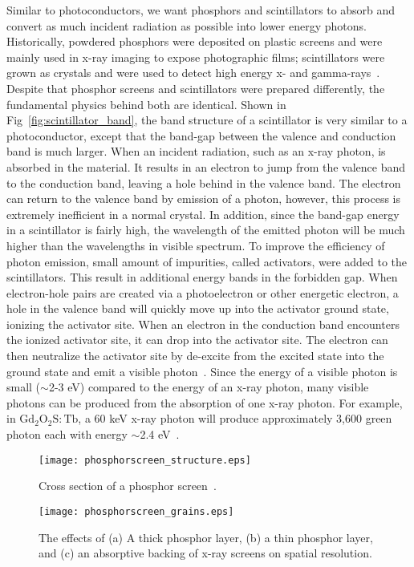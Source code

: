 Similar to photoconductors, we want phosphors and scintillators to absorb and convert as much incident radiation as possible into lower energy photons.  Historically, powdered phosphors were deposited on plastic screens and were mainly used in x-ray imaging to expose photographic films; scintillators were grown as crystals and were used to detect high energy x- and gamma-rays~\citep{Nikl2006}.  Despite that phosphor screens and scintillators were prepared differently, the fundamental physics behind both are identical.  Shown in Fig~\ref{fig:scintillator_band}, the band structure of a scintillator is very similar to a photoconductor, except that the band-gap between the valence and conduction band is much larger.  When an incident radiation, such as an x-ray photon, is absorbed in the material.  It results in an electron to jump from the valence band to the conduction band, leaving a hole behind in the valence band.  The electron can return to the valence band by emission of a photon, however, this process is extremely inefficient in a normal crystal.  In addition, since the band-gap energy in a scintillator is fairly high, the wavelength of the emitted photon will be much higher than the wavelengths in visible spectrum.  To improve the efficiency of photon emission, small amount of impurities, called activators, were added to the scintillators.  This result in additional energy bands in the forbidden gap.  When electron-hole pairs are created via a photoelectron or other energetic electron, a hole in the valence band will quickly move up into the activator ground state, ionizing the activator site.  When an electron in the conduction band encounters the ionized activator site, it can drop into the activator site.  The electron can then neutralize the activator site by de-excite from the excited state into the ground state and emit a visible photon~\citep{Knoll2010}.  Since the energy of a visible photon is small ($\sim$2-3 eV) compared to the energy of an x-ray photon, many visible photons can be produced from the absorption of one x-ray photon.  For example, in $\mathrm{Gd_2O_2S:Tb}$, a 60 keV x-ray photon will produce approximately 3,600 green photon each with energy $\sim$2.4 eV~\citep{Rowlands2000}.

\begin{figure}[h]
\texttt{[image: phosphorscreen\_structure.eps]}
\caption{Cross section of a phosphor screen~\citep{Barrett1981}.}
\label{fig:phosphor_cross_section}
\end{figure}

\begin{figure}[h]
\texttt{[image: phosphorscreen\_grains.eps]}
\caption{The effects of (a) A thick phosphor layer, (b) a thin phosphor layer, and (c) an absorptive backing of x-ray screens on spatial resolution.}
\label{fig:phosphor_effects}
\end{figure}

